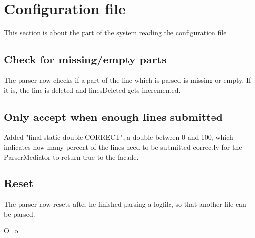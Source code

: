 \section{Configuration file}

This section is about the part of the system reading the configuration file

\subsection{Check for missing/empty parts}
The parser now checks if a part of the line which is parsed is missing or empty. If it is, the line is deleted and 
linesDeleted gets incremented.

\subsection{Only accept when enough lines submitted}
Added "final static double CORRECT", a double between 0 and 100, which indicates how many percent of the lines need to be
submitted correctly for the ParserMediator to return true to the facade.

\subsection{Reset}
The parser now resets after he finished parsing a logfile, so that another file can be parsed.

O\_o
